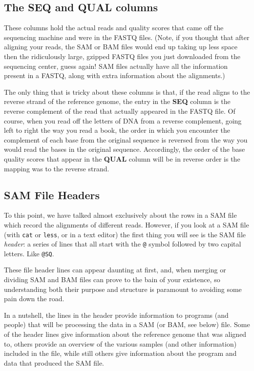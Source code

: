\documentclass[]{krantz}
\begin{document}
\hypertarget{the-seq-and-qual-columns}{%
\subsection{The SEQ and QUAL columns}\label{the-seq-and-qual-columns}}

These columns hold the actual reads and quality scores that came off the
sequencing machine and were in the FASTQ files. (Note, if you thought that
after aligning your reads, the SAM or BAM files would end up taking up less space then the ridiculously
large, gzipped FASTQ files you just downloaded from the sequencing center,
guess again! SAM files actually have all the information present in a FASTQ, along with extra
information about the alignments.)

The only thing that is tricky about these columns is that, if the read aligns to the
reverse strand of the reference genome, the entry in the \textbf{SEQ} column is the
reverse complement of the read that actually appeared in the FASTQ file. Of course,
when you read off the letters of DNA from a reverse complement, going left to right
the way you read a book, the order in which you encounter the complement of each base
from the original sequence is reversed from the way you would read the bases
in the original sequence. Accordingly, the order of the base quality scores that
appear in the \textbf{QUAL} column will be in reverse order is the mapping was to the
reverse strand.

\hypertarget{sam-file-headers}{%
\subsection{SAM File Headers}\label{sam-file-headers}}

To this point, we have talked almost exclusively about the rows in a SAM file
which record the alignments of different reads. However, if you look at a SAM file
(with \texttt{cat} or \texttt{less}, or in a text editor) the first thing you will see is the
SAM file \emph{header}: a series of lines that all start with the \texttt{@} symbol followed by
two capital letters. Like \texttt{@SQ}.

These file header lines can appear daunting at first, and, when merging or dividing
SAM and BAM files can prove to the bain of your existence, so understanding both their
purpose and structure is paramount to avoiding some pain down the road.

In a nutshell, the lines in the header provide information to programs (and people)
that will be processing the data in a SAM (or BAM, see below) file. Some of the header
lines give information about the reference genome that was aligned to, others
provide an overview of the various samples (and other information) included in the file,
while still others give information about the program and data that produced the
SAM file.
\end{document}
